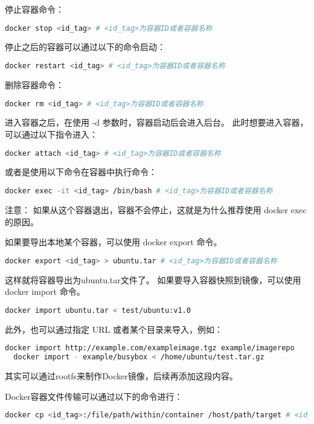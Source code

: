 \documentclass[lang=cn,a4paper,newtx]{elegantpaper}
\begin{document}
停止容器命令：
\begin{lstlisting}[language=bash]
  docker stop <id_tag> # <id_tag>为容器ID或者容器名称
\end{lstlisting}

停止之后的容器可以通过以下的命令启动：
\begin{lstlisting}[language=bash]
  docker restart <id_tag> # <id_tag>为容器ID或者容器名称
\end{lstlisting}

删除容器命令：
\begin{lstlisting}[language=bash]
  docker rm <id_tag> # <id_tag>为容器ID或者容器名称
\end{lstlisting}

进入容器之后，在使用 -d 参数时，容器启动后会进入后台。
此时想要进入容器，可以通过以下指令进入：
\begin{lstlisting}[language=bash]
  docker attach <id_tag> # <id_tag>为容器ID或者容器名称
\end{lstlisting}

或者是使用以下命令在容器中执行命令：
\begin{lstlisting}[language=bash]
  docker exec -it <id_tag> /bin/bash # <id_tag>为容器ID或者容器名称
\end{lstlisting}

注意： 如果从这个容器退出，容器不会停止，这就是为什么推荐使用 docker exec 的原因。

如果要导出本地某个容器，可以使用 docker export 命令。
\begin{lstlisting}[language=bash]
  docker export <id_tag> > ubuntu.tar # <id_tag>为容器ID或者容器名称
\end{lstlisting}

这样就将容器导出为ubuntu.tar文件了。
如果要导入容器快照到镜像，可以使用 docker import 命令。
\begin{lstlisting}[language=bash]
  docker import ubuntu.tar < test/ubuntu:v1.0
\end{lstlisting}

此外，也可以通过指定 URL 或者某个目录来导入，例如：
\begin{lstlisting}[language=bash]
  docker import http://example.com/exampleimage.tgz example/imagerepo
  docker import - example/busybox < /home/ubuntu/test.tar.gz
\end{lstlisting}

其实可以通过rootfs来制作Docker镜像，后续再添加这段内容。

Docker容器文件传输可以通过以下的命令进行：
\begin{lstlisting}[language=bash]
  docker cp <id_tag>:/file/path/within/container /host/path/target # <id_tag>为容器ID或者容器名称
\end{lstlisting}
\end{document}
